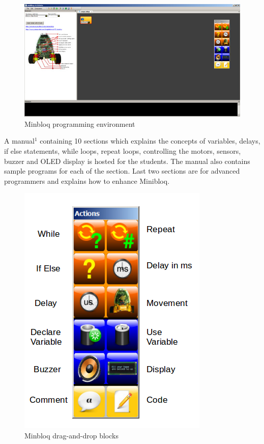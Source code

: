 \documentclass[conference]{IEEEtran}
\begin{document}
\begin{figure}[h]
\centering
\includegraphics[scale=0.3]{Fig_08.png}
\caption{Minbloq programming environment}
\end{figure}

A manual$^1$ containing 10 sections which explains the concepts of variables, delays, if else statements, while loops, repeat loops, controlling the motors, sensors, buzzer and OLED display is hosted for the students. The manual also contains sample programs for each of the section. Last two sections are for advanced programmers and explains how to enhance Minibloq.

\begin{figure}[h]
\centering
\includegraphics[scale=0.3]{Fig_09.png}
\caption{Minbloq drag-and-drop blocks}
\end{figure}
\end{document}
